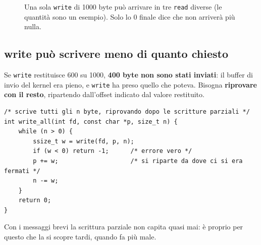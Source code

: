 \begin{figure}[H]
\centering
{}
\caption{Una sola \texttt{write} di 1000 byte può arrivare in tre \texttt{read} diverse (le quantità sono un esempio).
         Solo lo 0 finale dice che non arriverà più nulla.}
\end{figure}

\subsection{write può scrivere meno di quanto chiesto}

Se \texttt{write} restituisce 600 su 1000, \textbf{400 byte non sono stati inviati}: il buffer di invio del kernel era
pieno, e \texttt{write} ha preso quello che poteva. Bisogna \textbf{riprovare con il resto}, ripartendo dall'offset
indicato dal valore restituito.

\begin{lstlisting}[language={[POSIX]C}]
/* scrive tutti gli n byte, riprovando dopo le scritture parziali */
int write_all(int fd, const char *p, size_t n) {
    while (n > 0) {
        ssize_t w = write(fd, p, n);
        if (w < 0) return -1;      /* errore vero */
        p += w;                    /* si riparte da dove ci si era fermati */
        n -= w;
    }
    return 0;
}
\end{lstlisting}

Con i messaggi brevi la scrittura parziale non capita quasi mai: è proprio per questo che la si scopre tardi, quando fa
più male.


